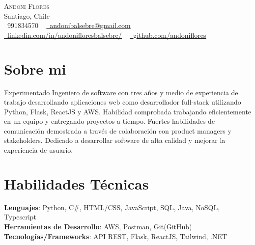 \documentclass[letterpaper,11pt]{article}
\newcommand{\resumeSubHeadingListStart}{\begin{itemize}[leftmargin=0.0in, label={}]}
\newcommand{\resumeSubHeadingListEnd}{\end{itemize}}
\begin{document}

\begin{center}
    {\Huge \scshape Andoni Flores} \\ \vspace{1pt}
    Santiago, Chile  \\ \vspace{1pt}
    \small \raisebox{-0.1\height}\faPhone\ 991834570 ~ \href{mailto:andonibalsebre@gmail.com}{\raisebox{-0.2\height}\faEnvelope\  \underline{andonibalsebre@gmail.com}} ~ 
    \href{https://linkedin.com/in/andonifloresbalsebre/}{\raisebox{-0.2\height}\faLinkedin\ \underline{linkedin.com/in/andonifloresbalsebre/}}  ~
    \href{https://github.com/andoniflores}{\raisebox{-0.2\height}\faGithub\ \underline{github.com/andoniflores}}
    \vspace{-8pt}
\end{center}
%

\section{Sobre mi}
  \resumeSubHeadingListStart
    \small{\item{Experimentado Ingeniero de software con tres años y medio de experiencia de trabajo
        desarrollando aplicaciones web como desarrollador full-stack utilizando Python, Flask,
        ReactJS y AWS. Habilidad comprobada trabajando eficientemente en un equipo y entregando
        proyectos a tiempo. Fuertes habilidades de comunicación demostrada a través de colaboración
        con product managers y stakeholders. Dedicado a desarrollar software de alta calidad y
        mejorar la experiencia de usuario.}}
  \resumeSubHeadingListEnd

\section{Habilidades Técnicas}
 \begin{itemize}[leftmargin=0.15in, label={}]
    \small{\item{
     \textbf{Lenguajes}{: Python, C\#, HTML/CSS, JavaScript, SQL, Java, NoSQL, Typescript} \\
     \textbf{Herramientas de Desarrollo}{: AWS, Postman, Git(GitHub)} \\
     \textbf{Tecnologías/Frameworks}{: API REST, Flask, ReactJS, Tailwind, .NET} \\
    }}
 \end{itemize}
 \vspace{-16pt}
\end{document}
